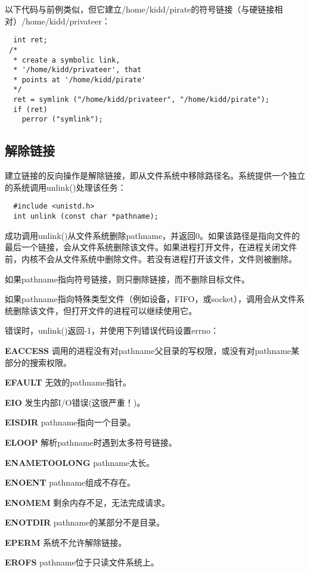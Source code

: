 以下代码与前例类似，但它建立/home/kidd/pirate的符号链接（与硬链接相对）/home/kidd/privateer：

\begin{lstlisting}
  int ret;
 /*
  * create a symbolic link,
  * '/home/kidd/privateer', that
  * points at '/home/kidd/pirate'
  */
  ret = symlink ("/home/kidd/privateer", "/home/kidd/pirate");
  if (ret)
    perror ("symlink");
\end{lstlisting}

\subsection{解除链接}

建立链接的反向操作是解除链接，即从文件系统中移除路径名。系统提供一个独立的系统调用unlink()处理该任务：

\begin{lstlisting}
  #include <unistd.h>
  int unlink (const char *pathname);
\end{lstlisting}

成功调用unlink()从文件系统删除pathname，并返回0。如果该路径是指向文件的最后一个链接，会从文件系统删除该文件。如果进程打开文件，在进程关闭文件前，内核不会从文件系统中删除文件。若没有进程打开该文件，文件则被删除。

如果pathname指向符号链接，则只删除链接，而不删除目标文件。

如果pathname指向特殊类型文件（例如设备，FIFO，或socket），调用会从文件系统删除该文件，但打开文件的进程可以继续使用它。

错误时，unlink()返回-1，并使用下列错误代码设置errno：

\begin{eqlist*}
\item[\textbf{EACCESS}] 调用的进程没有对pathname父目录的写权限，或没有对pathname某部分的搜索权限。
\item[\textbf{EFAULT}] 无效的pathname指针。
\item[\textbf{EIO}] 发生内部I/O错误(这很严重！)。
\item[\textbf{EISDIR}] pathname指向一个目录。
\item[\textbf{ELOOP}] 解析pathname时遇到太多符号链接。
\item[\textbf{ENAMETOOLONG}] pathname太长。
\item[\textbf{ENOENT}] pathname组成不存在。
\item[\textbf{ENOMEM}] 剩余内存不足，无法完成请求。
\item[\textbf{ENOTDIR}] pathname的某部分不是目录。
\item[\textbf{EPERM}] 系统不允许解除链接。
\item[\textbf{EROFS}] pathname位于只读文件系统上。
\end{eqlist*}


